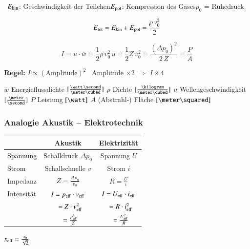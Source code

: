 {\small \textrightarrow\ $E_{\rm kin}$: \textquotesingle Geschwindigkeit der Teilchen\textquotesingle \qquad $E_{\rm pot}$: \textquotesingle Kompression des Gases\textquotesingle \qquad $p_0$ = Ruhedruck}

$$ E_{\rm tot} = E_{\rm kin} + E_{\rm pot} = \frac{\rho \, v_0^2}{2} $$

$$ \boxed{ I = u \cdot \overline{w} = \frac{1}{2} \rho \, v_0^2 \, u = \frac{1}{2} Z \, v_0^2 = \frac{(\Delta p_0)^2}{2 \, Z} = \frac{P}{A} } $$

\textbf{Regel:} $I \propto (\text{Amplitude})^2$ \quad \textrightarrow\ Amplitude $\times 2$ $\Rightarrow$ $I \times 4$ \quad {}

{\small $\overline{w}$ Energieflussdichte $[\frac{\watt \, \second}{\meter\cubed}]$ \quad $\rho$ Dichte $[\frac{\kilogram}{\meter\cubed}]$ \quad $u$ Wellengeschwindigkeit $[\frac{\meter}{\second}]$ \quad $P$ Leistung $[\watt]$ \quad $A$ (Abstrahl-) Fläche $[\meter\squared]$}

\subsubsection{Analogie Akustik -- Elektrotechnik}

\renewcommand{\arraystretch}{1.4}
\begin{tabular}{l|c|c}
                & \textbf{Akustik}                          & \textbf{Elektrizität}                     \\ \hline
    Spannung    & Schalldruck $\Delta p_0$                  & Spannung $U$                              \\
    Strom       & Schallschnelle $v$                        & Strom $i$                                 \\
    Impedanz    & $Z = \frac{\Delta p_0}{v_0}$              & $R = \frac{U}{i}$                         \\
    Intensität  & $I = p_{\rm eff} \cdot v_{\rm eff}$       & $I = U_{\rm eff} \cdot i_{\rm eff}$       \\
                & $\phantom{I} = Z \cdot v_{\rm eff}^2$     & $\phantom{I} = R \cdot i_{\rm eff}^2$     \\
                & $\phantom{I} = \frac{p_{\rm eff}^2}{Z}$   & $\phantom{I} = \frac{U_{\rm eff}^2}{R}$
\end{tabular}
\renewcommand{\arraystretch}{1}

\smallskip

$ x_{\rm eff} = \frac{x_0}{\sqrt{2}} $


